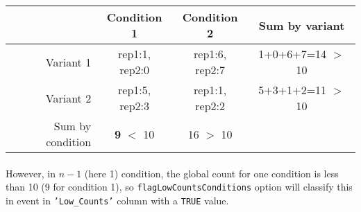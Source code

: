 \documentclass[english, a4paper, 12pt]{article}
\begin{document}
\begin{tabular}{r|c|c|c}
  \hline
   & Condition 1 & Condition 2& Sum by variant \\
  \hline
  Variant 1 &	rep1:1, rep2:0 & rep1:6, rep2:7&  1+0+6+7=14 $>$ 10 \\
 Variant 2 &	rep1:5, rep2:3 & rep1:1, rep2:2&  5+3+1+2=11 $>$ 10 \\
  \hline
 Sum by condition &	\textbf{9} $<$ 10 	&16 $>$ 10 & \\ 	
  \hline
\end{tabular}

\paragraph{}However, in $n-1$ (here 1) condition, the global count for one condition is less than 10 (9 for condition 1), so \texttt{flagLowCountsConditions} option will classify this in event in \texttt{'Low\_Counts'} column with a \texttt{TRUE} value. 
\end{document}
